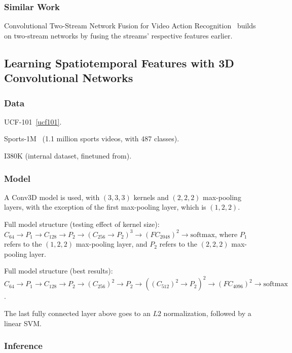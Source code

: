 \documentclass[a4paper, 12pt]{article}
\begin{document}
\subsubsection{Similar Work}

Convolutional Two-Stream Network Fusion for Video Action
Recognition~\cite{DBLP:journals/corr/FeichtenhoferPZ16} builds on two-stream
networks by fusing the streams' respective features earlier.

\subsection{Learning Spatiotemporal Features with 3D Convolutional
            Networks\cite{DBLP:journals/corr/TranBFTP14}}

\subsubsection{Data}

UCF-101~\ref{ucf101}.

Sports-1M~\cite{KarpathyCVPR14} (1.1 million sports videos, with 487 classes).

I380K (internal dataset, finetuned from).

\subsubsection{Model}

A Conv3D model is used, with $(3, 3, 3)$ kernels and $(2, 2, 2)$ max-pooling
layers, with the exception of the first max-pooling layer, which is
$(1, 2, 2)$.

Full model structure (testing effect of kernel size):
$C_{64} \rightarrow P_1 \rightarrow C_{128} \rightarrow P_2 \rightarrow
{(C_{256} \rightarrow P_2)}^3 \rightarrow {(FC_{2048})}^2 \rightarrow
\textrm{softmax}$, where $P_1$ refers to the $(1, 2, 2)$ max-pooling layer, and
$P_2$ refers to the $(2, 2, 2)$ max-pooling layer.

Full model structure (best results):
$C_{64} \rightarrow P_1 \rightarrow C_{128} \rightarrow P_2 \rightarrow
{(C_{256})}^2 \rightarrow P_2 \rightarrow
{({(C_{512})}^2 \rightarrow P_2)}^2 \rightarrow {(FC_{4096})}^2 \rightarrow
\textrm{softmax}$.

The last fully connected layer above goes to an $L2$ normalization, followed by
a linear SVM\@.

\subsubsection{Inference}
\end{document}
